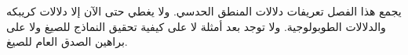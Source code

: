 \documentclass[../../../include/open-logic-chapter]{subfiles}
\begin{document}

\begin{editorial}
  يجمع هذا الفصل تعريفات دلالات المنطق الحدسي. ولا يغطي حتى الآن إلا
  دلالات كريبكه والدلالات الطوبولوجية. ولا توجد بعد أمثلة لا على كيفية
  تحقيق النماذج للصيغ ولا على براهين الصدق العام للصيغ.
\end{editorial}


\OLEndChapterHook
\end{document}
